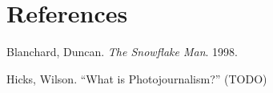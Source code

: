 \section*{References}

\bibent Blanchard, Duncan. \textit{The Snowflake Man}. 1998.

\bibent Hicks, Wilson. ``What is Photojournalism?'' (TODO)

